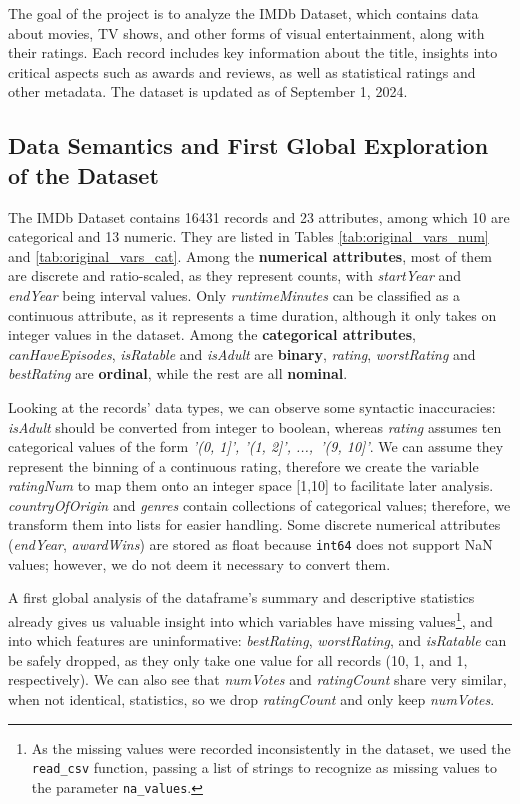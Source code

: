 The goal of the project is to analyze the IMDb Dataset, which contains data about movies, TV shows, and other forms of visual entertainment, along with their ratings.
Each record includes key information about the title, insights into critical aspects such as awards and reviews, as well as statistical ratings and other metadata. The dataset is updated as of September 1, 2024.

\subsection{Data Semantics and First Global Exploration of the Dataset}
\label{data_semantics}
The IMDb Dataset contains 16431 records and 23 attributes, among which 10 are categorical and 13 numeric. They are listed in Tables \ref{tab:original_vars_num} and \ref{tab:original_vars_cat}.
Among the \textbf{numerical attributes}, most of them are discrete and ratio-scaled, as they represent counts, with \textit{startYear} and \textit{endYear} being interval values.
Only \textit{runtimeMinutes} can be classified as a continuous attribute, as it represents a time duration, although it only takes on integer values in the dataset.
Among the \textbf{categorical attributes}, \textit{canHaveEpisodes}, \textit{isRatable} and \textit{isAdult} are \textbf{binary}, \textit{rating}, \textit{worstRating} and \textit{bestRating} are \textbf{ordinal}, while the rest are all \textbf{nominal}.

Looking at the records' data types, we can observe some syntactic inaccuracies: \textit{isAdult }should be converted from integer to boolean, whereas \textit{rating} assumes ten categorical values of the form  \textit{'(0, 1]', '(1, 2]', ..., '(9, 10]'}. We can assume they represent the binning of a continuous rating, therefore we create the variable \textit{ratingNum} to map them onto an integer space [1,10] to facilitate later analysis. \textit{countryOfOrigin} and \textit{genres} contain collections of categorical values; therefore, we transform them into lists for easier handling. Some discrete numerical attributes (\textit{endYear}, \textit{awardWins}) are stored as float because \texttt{int64} does not support NaN values; however, we do not deem it necessary to convert them.

A first global analysis of the dataframe's summary and descriptive statistics already gives us valuable insight into which variables have missing values\footnote{As the missing values were recorded inconsistently in the dataset, we used the \texttt{read\_csv} function, passing a list of strings to recognize as missing values to the parameter \texttt{na\_values}.}, and into which features are uninformative: \textit{bestRating}, \textit{worstRating}, and \textit{isRatable} can be safely dropped, as they only take one value for all records (10, 1, and 1, respectively). We can also see that \textit{numVotes} and \textit{ratingCount} share very similar, when not identical, statistics, so we drop \textit{ratingCount} and only keep \textit{numVotes}.

